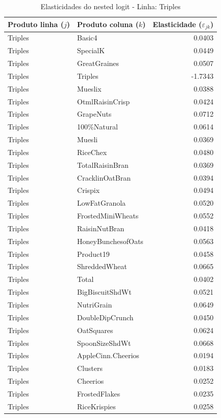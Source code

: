 \begingroup
\begin{table}[H]
\centering
\caption{Elasticidades do nested logit - Linha: Triples}
\label{tab:elas-nested-triples}
\small
\begin{tabular}{llr}
\toprule
Produto linha ($j$) & Produto coluna ($k$) & Elasticidade ($\varepsilon_{jk}$) \\
\midrule
Triples & Basic4 & 0.0403 \\
Triples & SpecialK & 0.0449 \\
Triples & GreatGraines & 0.0507 \\
Triples & Triples & -1.7343 \\
Triples & Mueslix & 0.0388 \\
Triples & OtmlRaisinCrisp & 0.0424 \\
Triples & GrapeNuts & 0.0712 \\
Triples & 100\%Natural & 0.0614 \\
Triples & Muesli & 0.0369 \\
Triples & RiceChex & 0.0480 \\
Triples & TotalRaisinBran & 0.0369 \\
Triples & CracklinOatBran & 0.0394 \\
Triples & Crispix & 0.0494 \\
Triples & LowFatGranola & 0.0520 \\
Triples & FrostedMiniWheats & 0.0552 \\
Triples & RaisinNutBran & 0.0418 \\
Triples & HoneyBunchesofOats & 0.0563 \\
Triples & Product19 & 0.0458 \\
Triples & ShreddedWheat & 0.0665 \\
Triples & Total & 0.0402 \\
Triples & BigBiscuitShdWt & 0.0521 \\
Triples & NutriGrain & 0.0649 \\
Triples & DoubleDipCrunch & 0.0450 \\
Triples & OatSquares & 0.0624 \\
Triples & SpoonSizeShdWt & 0.0668 \\
Triples & AppleCinn.Cheerios & 0.0194 \\
Triples & Clusters & 0.0183 \\
Triples & Cheerios & 0.0252 \\
Triples & FrostedFlakes & 0.0235 \\
Triples & RiceKrispies & 0.0258 \\

\end{tabular}
\end{table}
